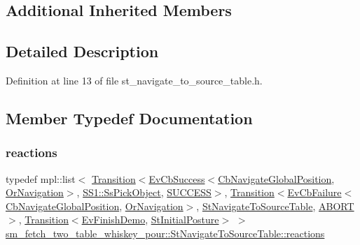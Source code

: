 \subsection*{Additional Inherited Members}


\subsection{Detailed Description}


Definition at line 13 of file st\+\_\+navigate\+\_\+to\+\_\+source\+\_\+table.\+h.



\subsection{Member Typedef Documentation}
\mbox{\label{structsm__fetch__two__table__whiskey__pour_1_1StNavigateToSourceTable_ab9e387d50eba6f856523c58add1a30d1}} 
\subsubsection{\texorpdfstring{reactions}{reactions}}
{\footnotesize\ttfamily typedef mpl\+::list$<$ \hyperlink{classsmacc_1_1Transition}{Transition}$<$\hyperlink{structsmacc_1_1EvCbSuccess}{Ev\+Cb\+Success}$<$\hyperlink{classcl__move__base__z_1_1CbNavigateGlobalPosition}{Cb\+Navigate\+Global\+Position}, \hyperlink{classsm__fetch__two__table__whiskey__pour_1_1OrNavigation}{Or\+Navigation}$>$, \hyperlink{structsm__fetch__two__table__whiskey__pour_1_1SS1_1_1SsPickObject}{S\+S1\+::\+Ss\+Pick\+Object}, \hyperlink{structsmacc_1_1default__transition__tags_1_1SUCCESS}{S\+U\+C\+C\+E\+SS}$>$, \hyperlink{classsmacc_1_1Transition}{Transition}$<$\hyperlink{structsmacc_1_1EvCbFailure}{Ev\+Cb\+Failure}$<$\hyperlink{classcl__move__base__z_1_1CbNavigateGlobalPosition}{Cb\+Navigate\+Global\+Position}, \hyperlink{classsm__fetch__two__table__whiskey__pour_1_1OrNavigation}{Or\+Navigation}$>$, \hyperlink{structsm__fetch__two__table__whiskey__pour_1_1StNavigateToSourceTable}{St\+Navigate\+To\+Source\+Table}, \hyperlink{structsmacc_1_1default__transition__tags_1_1ABORT}{A\+B\+O\+RT}$>$, \hyperlink{classsmacc_1_1Transition}{Transition}$<$\hyperlink{structsm__fetch__two__table__whiskey__pour_1_1EvFinishDemo}{Ev\+Finish\+Demo}, \hyperlink{structsm__fetch__two__table__whiskey__pour_1_1StInitialPosture}{St\+Initial\+Posture}$>$ $>$ \hyperlink{structsm__fetch__two__table__whiskey__pour_1_1StNavigateToSourceTable_ab9e387d50eba6f856523c58add1a30d1}{sm\+\_\+fetch\+\_\+two\+\_\+table\+\_\+whiskey\+\_\+pour\+::\+St\+Navigate\+To\+Source\+Table\+::reactions}}



